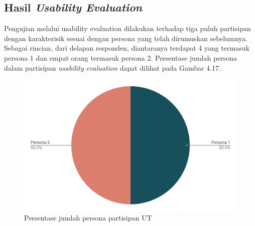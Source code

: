 	\subsection{Hasil \textit{Usability Evaluation}}
	Pengujian melalui usability evaluation dilakukan terhadap tiga puluh partisipan dengan karakterisik sesuai dengan persona yang telah dirumuskan sebelumnya. Sebagai rincian, dari delapan responden, diantaranya terdapat 4 yang termasuk persona 1 dan empat orang termasuk persona 2. Persentase jumlah persona dalam partisipan \textit{usability evaluation} dapat dilihat pada Gambar 4.17.
	\begin{figure}
		\includegraphics[width=\linewidth]{pics/persentase-jumlah-persona}
		\caption{Persentase jumlah persona partisipan UT}
		\centering
	\end{figure}
